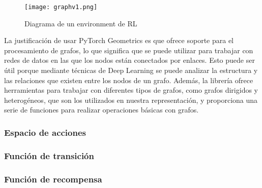 \begin{figure}[ht]
    \centering
    \texttt{[image: graphv1.png]}
    \caption{Diagrama de un environment de RL}
    \label{fig:rl}
\end{figure}

La justificación de usar PyTorch Geometrics es que ofrece soporte para el procesamiento de grafos,
lo que significa que se puede utilizar para trabajar con redes de datos en las que los nodos están
conectados por enlaces. Esto puede ser útil porque mediante técnicas de Deep Learning se puede analizar
la estructura y las relaciones que existen entre los nodos de un grafo. Además, la librería ofrece herramientas
para trabajar con diferentes tipos de grafos, como grafos dirigidos y heterogéneos, que son los utilizados en
nuestra representación, y proporciona una serie de funciones para realizar operaciones básicas con grafos.

\subsubsection{Espacio de acciones}

\subsubsection{Función de transición}

\subsubsection{Función de recompensa}

\pagebreak
